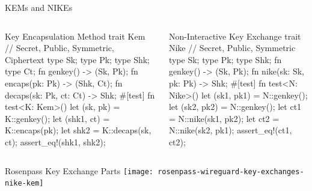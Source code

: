 \begin{frame}[fragile,T,s]{KEMs and NIKEs}
\small
  \begin{columns}[t,fullwidth]
      \hfill
    \begin{column}{.47\linewidth}
\begin{rustblock}{Key Encapsulation Method}
trait Kem {
  // Secret, Public, Symmetric, Ciphertext
  type Sk; type Pk; type Shk; type Ct;
  fn genkey() -> (Sk, Pk);
  fn encaps(pk: Pk) -> (Shk, Ct);
  fn decaps(sk: Pk, ct: Ct) -> Shk;
}
#[test]
fn test<K: Kem>() {
  let (sk, pk) = K::genkey();
  let (shk1, ct) = K::encaps(pk);
  let shk2 = K::decaps(sk, ct);
  assert_eq!(shk1, shk2);
}
\end{rustblock}
    \end{column}
    \hfill
    \begin{column}{.47\linewidth}
\begin{rustblock}{Non-Interactive Key Exchange}
trait Nike {
  // Secret, Public, Symmetric
  type Sk; type Pk; type Shk;
  fn genkey() -> (Sk, Pk);
  fn nike(sk: Sk, pk: Pk) -> Shk;
}
#[test]
fn test<N: Nike>() {
  let (sk1, pk1) = N::genkey();
  let (sk2, pk2) = N::genkey();
  let ct1 = N::nike(sk1, pk2);
  let ct2 = N::nike(sk2, pk1);
  assert_eq!(ct1, ct2);
}
\end{rustblock}
    \end{column}
	\hfill
  \end{columns}
  \vfill
\end{frame}

\begin{frame}{Rosenpass Key Exchange Parts}
  \centering
  \texttt{[image: rosenpass-wireguard-key-exchanges-nike-kem]}
\end{frame}








